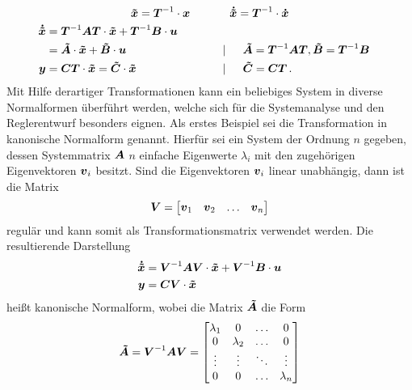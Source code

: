 \begin{equation}
\boldsymbol{\tilde{x}} = \boldsymbol{T}^{-1}\cdot\boldsymbol{x} \hspace{35pt}\boldsymbol{\dot{\tilde{x}}} = \boldsymbol{T}^{-1}\cdot \boldsymbol{\dot{x}}
\end{equation}
\begin{align}
\boldsymbol{\dot{\tilde{x}}} &= \boldsymbol{T}^{-1}\boldsymbol{A}\boldsymbol{T}\cdot \boldsymbol{\tilde{x}} + \boldsymbol{T}^{-1}\boldsymbol{B}\cdot \boldsymbol{u} \nonumber \\
& = \boldsymbol{\tilde{A}}\cdot \boldsymbol{\tilde{x}} + \boldsymbol{\tilde{B}}\cdot \boldsymbol{u} &&\hspace{30pt} \vert \hspace{15pt} \boldsymbol{\tilde{A}} = \boldsymbol{T}^{-1}\boldsymbol{A}\boldsymbol{T}, \boldsymbol{\tilde{B}} = \boldsymbol{T}^{-1}\boldsymbol{B}
\\
\boldsymbol{y} &= \boldsymbol{C}\boldsymbol{T}\cdot \boldsymbol{\tilde{x}} 
= \boldsymbol{\tilde{C}}\cdot \boldsymbol{\tilde{x}} &&\hspace{30pt} \vert \hspace{15pt} \boldsymbol{\tilde{C}} = \boldsymbol{C}\boldsymbol{T}\,.
\end{align}
Mit Hilfe derartiger Transformationen kann ein beliebiges System in diverse Normalformen überführt werden, welche sich für die Systemanalyse und den Reglerentwurf besonders eignen. Als erstes Beispiel sei die Transformation in kanonische Normalform genannt. Hierfür sei ein System  der Ordnung $n$ gegeben, dessen Systemmatrix $\boldsymbol{A}$ $n$ einfache Eigenwerte $\lambda_i$ mit den zugehörigen Eigenvektoren $\boldsymbol{v}_i$ besitzt. Sind die Eigenvektoren $\boldsymbol{v}_i$ linear unabhängig, dann ist die Matrix
\begin{equation}
\boldsymbol{V} = \begin{bmatrix}
\boldsymbol{v}_{\text{1}} & \boldsymbol{v}_{\text{2}} & \hdots & \boldsymbol{v}_n 
\end{bmatrix}
\end{equation}
regulär und kann somit als Transformationsmatrix verwendet werden. Die resultierende Darstellung
\begin{equation}
\begin{split}
\boldsymbol{\dot{\tilde{x}}} &= \boldsymbol{V}^{-1}\boldsymbol{A}\boldsymbol{V}\cdot \boldsymbol{\tilde{x}} + \boldsymbol{V}^{-1}\boldsymbol{B}\cdot \boldsymbol{u} \\
\boldsymbol{y} &= \boldsymbol{C}\boldsymbol{V}\cdot \boldsymbol{\tilde{x}}
\end{split}
\end{equation}
heißt kanonische Normalform, wobei die Matrix $\boldsymbol{\tilde{A}}$ die Form
\begin{equation}
\boldsymbol{\tilde{A}} = \boldsymbol{V}^{-1}\boldsymbol{A}\boldsymbol{V} = \begin{bmatrix}
\lambda_{\text{1}} & 0 & \hdots & 0 \\
0 & \lambda_{\text{2}} & \hdots & 0 \\
\vdots & \vdots & \ddots & \vdots \\
0 & 0 & \hdots & \lambda_n
\end{bmatrix}
\end{equation}
